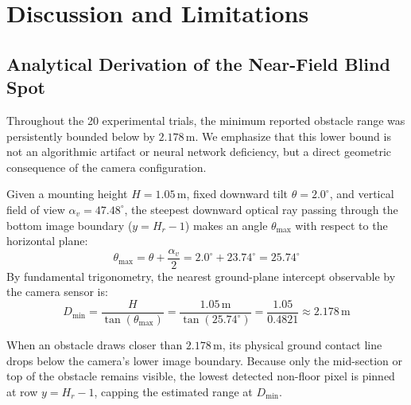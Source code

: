 \section{Discussion and Limitations}

\subsection{Analytical Derivation of the Near-Field Blind Spot}
Throughout the 20 experimental trials, the minimum reported obstacle range was persistently bounded below by $2.178\,\text{m}$. We emphasize that this lower bound is not an algorithmic artifact or neural network deficiency, but a direct geometric consequence of the camera configuration.

Given a mounting height $H = 1.05\,\text{m}$, fixed downward tilt $\theta = 2.0^\circ$, and vertical field of view $\alpha_v = 47.48^\circ$, the steepest downward optical ray passing through the bottom image boundary ($y = H_r - 1$) makes an angle $\theta_{\text{max}}$ with respect to the horizontal plane:
\begin{equation}
    \theta_{\text{max}} = \theta + \frac{\alpha_v}{2} = 2.0^\circ + 23.74^\circ = 25.74^\circ
\end{equation}
By fundamental trigonometry, the nearest ground-plane intercept observable by the camera sensor is:
\begin{equation}
    D_{\text{min}} = \frac{H}{\tan(\theta_{\text{max}})} = \frac{1.05\,\text{m}}{\tan(25.74^\circ)} = \frac{1.05}{0.4821} \approx 2.178\,\text{m}
\end{equation}

When an obstacle draws closer than $2.178\,\text{m}$, its physical ground contact line drops below the camera's lower image boundary. Because only the mid-section or top of the obstacle remains visible, the lowest detected non-floor pixel is pinned at row $y = H_r - 1$, capping the estimated range at $D_{\text{min}}$.

